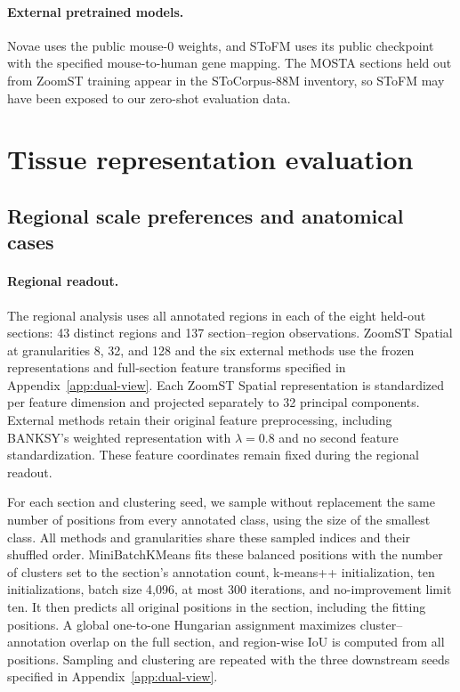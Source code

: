 \paragraph{External pretrained models.}
Novae uses the public mouse-0 weights, and SToFM uses its public checkpoint with the specified mouse-to-human gene mapping. The MOSTA sections held out from ZoomST training appear in the SToCorpus-88M inventory, so SToFM may have been exposed to our zero-shot evaluation data.



\section{Tissue representation evaluation}
\label{app:scale-cases}

\subsection{Regional scale preferences and anatomical cases}
\label{app:region-scale}

\paragraph{Regional readout.}
The regional analysis uses all annotated regions in each of the eight held-out sections: 43 distinct regions and 137 section--region observations. ZoomST Spatial at granularities 8, 32, and 128 and the six external methods use the frozen representations and full-section feature transforms specified in Appendix~\ref{app:dual-view}. Each ZoomST Spatial representation is standardized per feature dimension and projected separately to 32 principal components. External methods retain their original feature preprocessing, including BANKSY's weighted representation with $\lambda=0.8$ and no second feature standardization. These feature coordinates remain fixed during the regional readout.

For each section and clustering seed, we sample without replacement the same number of positions from every annotated class, using the size of the smallest class. All methods and granularities share these sampled indices and their shuffled order. MiniBatchKMeans fits these balanced positions with the number of clusters set to the section's annotation count, k-means++ initialization, ten initializations, batch size 4,096, at most 300 iterations, and no-improvement limit ten. It then predicts all original positions in the section, including the fitting positions. A global one-to-one Hungarian assignment maximizes cluster--annotation overlap on the full section, and region-wise IoU is computed from all positions. Sampling and clustering are repeated with the three downstream seeds specified in Appendix~\ref{app:dual-view}.

